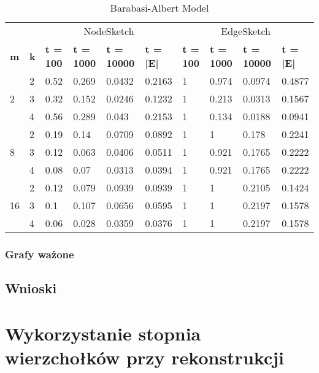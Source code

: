    \begin{table}[!ht]
        \centering
        \begin{tabular}{|l|l|l|l|l|l|l|l|l|l|}
        \hline
            & & \multicolumn{4}{c|}{NodeSketch} & \multicolumn{4}{c|}{EdgeSketch} \\ \cline{1-10}
            \textbf{m} & \textbf{k} & \textbf{t = 100} & \textbf{t = 1000} & \textbf{t = 10000} & \textbf{t = |E|} & \textbf{t = 100} & \textbf{t = 1000} & \textbf{t = 10000} & \textbf{t = |E|} \\ \hline\hline
            \multirow{3}{*}{2} & 2 & 0.52 & 0.269 & 0.0432 & 0.2163 & 1 & 0.974 & 0.0974 & 0.4877 \\ \cline{2-10}
            & 3 & 0.32 & 0.152 & 0.0246 & 0.1232 & 1 & 0.213 & 0.0313 & 0.1567 \\ \cline{2-10}
            & 4 & 0.56 & 0.289 & 0.043 & 0.2153 & 1 & 0.134 & 0.0188 & 0.0941 \\ \hline\hline
            \multirow{3}{*}{8} & 2 & 0.19 & 0.14 & 0.0709 & 0.0892 & 1 & 1 & 0.178 & 0.2241 \\ \cline{2-10}
            & 3 & 0.12 & 0.063 & 0.0406 & 0.0511 & 1 & 0.921 & 0.1765 & 0.2222 \\ \cline{2-10}
            & 4 & 0.08 & 0.07 & 0.0313 & 0.0394 & 1 & 0.921 & 0.1765 & 0.2222 \\ \hline\hline
            \multirow{3}{*}{16} & 2 & 0.12 & 0.079 & 0.0939 & 0.0939 & 1 & 1 & 0.2105 & 0.1424 \\ \cline{2-10}
            & 3 & 0.1 & 0.107 & 0.0656 & 0.0595 & 1 & 1 & 0.2197 & 0.1578 \\ \cline{2-10}
            & 4 & 0.06 & 0.028 & 0.0359 & 0.0376 & 1 & 1 & 0.2197 & 0.1578 \\ \hline
        \end{tabular}
        \caption{Barabasi-Albert Model}
    \end{table}

    \subsubsection{Grafy ważone}

    \subsection{Wnioski}

\section{Wykorzystanie stopnia wierzchołków przy rekonstrukcji}

